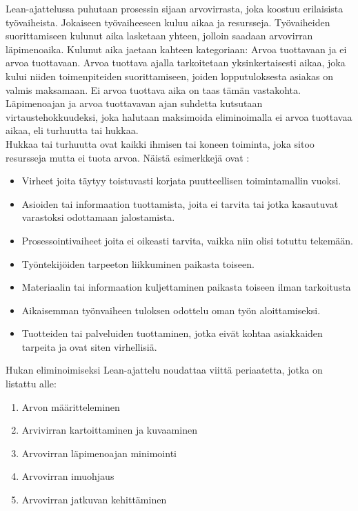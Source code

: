 \documentclass[finnish,12pt,a4paper,pdftex]{article}
\begin{document}
Lean-ajattelussa puhutaan prosessin sijaan arvovirrasta, joka koostuu erilaisista työvaiheista. Jokaiseen työvaiheeseen kuluu aikaa ja resursseja. Työvaiheiden suorittamiseen kulunut aika lasketaan yhteen, jolloin saadaan arvovirran läpimenoaika. Kulunut aika jaetaan kahteen kategoriaan: Arvoa tuottavaan ja ei arvoa tuottavaan. Arvoa tuottava ajalla tarkoitetaan yksinkertaisesti aikaa, joka kului niiden toimenpiteiden suorittamiseen, joiden lopputuloksesta asiakas on valmis maksamaan. Ei arvoa tuottava aika on taas tämän vastakohta. Läpimenoajan ja arvoa tuottavavan ajan suhdetta kutsutaan virtaustehokkuudeksi, joka halutaan maksimoida eliminoimalla ei arvoa tuottavaa aikaa, eli turhuutta tai hukkaa. \citep{leanthinking}\\

Hukkaa tai turhuutta ovat kaikki ihmisen tai koneen toiminta, joka sitoo resursseja mutta ei tuota arvoa. Näistä esimerkkejä ovat \citep{leanthinking}:
\begin{itemize}
\setlength{\itemsep}{0pt}
    \item Virheet joita täytyy toistuvasti korjata puutteellisen toimintamallin vuoksi.
    \item Asioiden tai informaation tuottamista, joita ei tarvita tai jotka kasautuvat varastoksi odottamaan jalostamista.
    \item Prosessointivaiheet joita ei oikeasti tarvita, vaikka niin olisi totuttu tekemään.
    \item Työntekijöiden tarpeeton liikkuminen paikasta toiseen.
    \item Materiaalin tai informaation kuljettaminen paikasta toiseen ilman tarkoitusta
    \item Aikaisemman työnvaiheen tuloksen odottelu oman työn aloittamiseksi.
    \item Tuotteiden tai palveluiden tuottaminen, jotka eivät kohtaa asiakkaiden tarpeita ja ovat siten virhellisiä.
\end{itemize}

Hukan eliminoimiseksi Lean-ajattelu noudattaa viittä periaatetta, jotka on listattu alle:

\begin{enumerate}
\setlength{\itemsep}{0pt}
    \item Arvon määritteleminen
    \item Arvivirran kartoittaminen ja kuvaaminen
    \item Arvovirran läpimenoajan minimointi
    \item Arvovirran imuohjaus
    \item Arvovirran jatkuvan kehittäminen
\end{enumerate}
\end{document}
